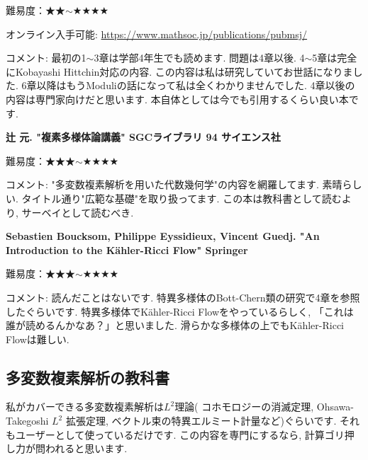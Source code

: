 難易度：★★$\sim$★★★★ \vspace{-6pt} 

オンライン入手可能: \url{https://www.mathsoc.jp/publications/pubmsj/}\vspace{-6pt}

コメント: 最初の1$\sim$3章は学部4年生でも読めます. 問題は4章以後.  4$\sim$5章は完全にKobayashi Hittchin対応の内容. この内容は私は研究していてお世話になりました. 6章以降はもうModuliの話になって私は全くわかりませんでした. 4章以後の内容は専門家向けだと思います. 本自体としては今でも引用するくらい良い本です. %
\vspace{8pt}

\textbf{辻 元. "複素多様体論講義" SGCライブラリ 94 サイエンス社}  \vspace{-6pt} 

難易度：★★★$\sim$★★★★ \vspace{-6pt} 

コメント: "多変数複素解析を用いた代数幾何学"の内容を網羅してます. 素晴らしい. タイトル通り"広範な基礎"を取り扱ってます. この本は教科書として読むより, サーベイとして読むべき. 
\vspace{8pt}

\textbf{Sebastien Boucksom, Philippe Eyssidieux, Vincent Guedj. "An Introduction to the Kähler-Ricci Flow" Springer}  \vspace{-6pt} 

難易度：★★★$\sim$★★★★ \vspace{-6pt} 

コメント: 読んだことはないです. 特異多様体のBott-Chern類の研究で4章を参照したぐらいです. 特異多様体でKähler-Ricci Flowをやっているらしく, 「これは誰が読めるんかなあ？」と思いました. 滑らかな多様体の上でもKähler-Ricci Flowは難しい. 

\subsection{多変数複素解析の教科書}

私がカバーできる多変数複素解析は$L^2$理論( コホモロジーの消滅定理, Ohsawa-Takegoshi $L^2$ 拡張定理, ベクトル束の特異エルミート計量など)ぐらいです. 
それもユーザーとして使っているだけです. 
この内容を専門にするなら, 計算ゴリ押し力が問われると思います. 

